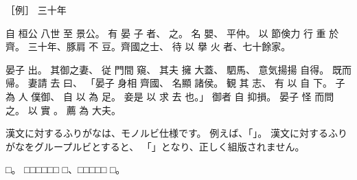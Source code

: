 \documentclass[paper=a5,tate]{jlreq}\listfiles
\newcommand*{\onelineskip}{\par\vspace{\baselineskip}\par}
\begin{document}
［例］
三十年

自
桓公
八世
至
景公。
有
晏
子
者、
之。
名
嬰、
平仲。
以
節倹力
行
重
於
齊。
三十年、豚肩
不
豆。齊國之士、
待
以
擧
火
者、七十餘家。

晏子
出。
其御之妻、
従
門間
窺、
其夫
擁
大蓋、
駟馬、
意気揚揚
自得。
既而
帰。
妻請
去
曰、
「晏子
身相
齊國、
名顯
諸侯。
観
其
志、
有
以
自
下。
子
為
人
僕御、
自
以
為
足。
妾是
以
求
去
也。」
御者
自
抑損。
晏子
怪
而問
之。
以
實
。
薦
為
大夫。

\onelineskip

漢文に対するふりがなは、モノルビ仕様です。
例えば、「」。
漢文に対するふりがなをグループルビとすると、
「」となり、正しく組版されません。

□。
□□□□□□
□、□□□□□
□。
\end{document}
